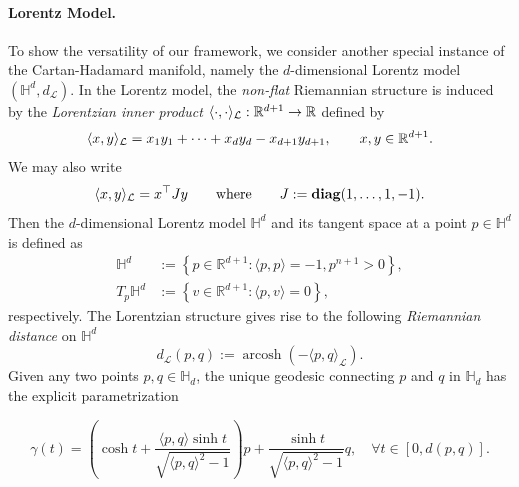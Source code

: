 \documentclass[twoside,11pt]{article}
\begin{document}
\paragraph{Lorentz Model.} To show the versatility of our framework, we consider another special instance of the Cartan-Hadamard manifold, namely the $d$-dimensional Lorentz model $(\mathbb{H}^d, d_\mathcal{L})$. In the Lorentz model, the \emph{non-flat} Riemannian structure is induced by the \textit{Lorentzian inner product} $\langle \cdot, \cdot \rangle_\mathcal{L}: \mathbb{R}^{d+1} \to \mathbb{R}$ defined by 
\[
\langle x, y \rangle_\mathcal{L} = x_1 y_1 + \cdots + x_d y_d - x_{d+1}y_{d+1}, \qquad x,y \in \mathbb{R}^{d+1}.
\]
We may also write 
\[
\langle x, y \rangle_\mathcal{L} = x^\top J y \qquad \text{where} \qquad J := \textbf{diag}(1, \ldots, 1, -1).
\]
Then the $d$-dimensional Lorentz model $\mathbb{H}^d$ and its tangent space at a point $p \in \mathbb{H}^d$ is defined as 
\[
\begin{aligned}
\mathbb{H}^d & :=\left\{p \in \mathbb{R}^{d+1}:\langle p, p\rangle=-1, p^{n+1}>0\right\}, \\
T_p \mathbb{H}^d & :=\left\{v \in \mathbb{R}^{d+1}:\langle p, v\rangle=0\right\},
\end{aligned}
\]
respectively. The Lorentzian structure gives rise to the following \textit{Riemannian distance} on $\mathbb{H}^d$ 
\[
d_\mathcal{L}(p,q) := \operatorname{arcosh}(-\langle p, q \rangle_\mathcal{L}). 
\]
 Given any two points $p,q \in \mathbb{H}_d$, the unique geodesic connecting $p$ and $q$ in $\mathbb{H}_d$ has the explicit parametrization 

\[
\gamma(t)=\left(\cosh t+\frac{\langle p, q\rangle \sinh t}{\sqrt{\langle p, q\rangle^2-1}}\right) p+\frac{\sinh t}{\sqrt{\langle p, q\rangle^2-1}} q, \quad \forall t \in[0, d(p, q)].
\]
\end{document}
